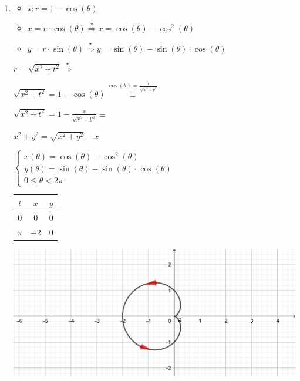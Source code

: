 \documentclass[../practica_02.tex]{subfiles}
\begin{document}
\begin{enumerate}
        \item 
            \begin{itemize}
                \item $\star: r=1-\cos(\theta)$
                \item $x= r\cdot\cos(\theta) \stackrel{\star}{\Rightarrow} x = \cos(\theta)-\cos^{2}(\theta)$
                \item $y= r\cdot\sin(\theta) \stackrel{\star}{\Rightarrow} y = \sin(\theta)-\sin(\theta)\cdot\cos(\theta)$
            \end{itemize}

            $ r = \sqrt{x^2 + t^2} \stackrel{\star}{\Rightarrow}$

            $ \sqrt{x^2 + t^2} = 1 - \cos(\theta) \stackrel{\cos(\theta)= \frac{x}{\sqrt{x^2 + y^2}}}{\equiv} $

            $ \sqrt{x^2 + t^2} = 1 - \frac{x}{\sqrt{x^2 + y^2}} \equiv $

            $ x^2 + y^2 = \sqrt{x^2 + y^2} - x$

            \quad $\left\{
                \begin{array}{ll}
                    x(\theta) = \cos(\theta)-\cos^{2}(\theta)\\
                    y(\theta) = \sin(\theta)-\sin(\theta)\cdot\cos(\theta)\\
                    0 \leq \theta < 2\pi
                \end{array}
            \right.$

            \begin{tabular}{ c|c|c } 
                \hline
                    $t$                 & $x$  & $y$ \\
                \hline
                    $0$                 & $0 $ & $0 $ \\ 
                    $\pi$               & $-2 $ & $0 $ \\
                \hline
            \end{tabular}

            \includegraphics[scale=0.8]{ej04/resources/b.png} $ $
    \end{enumerate}
\end{document}
